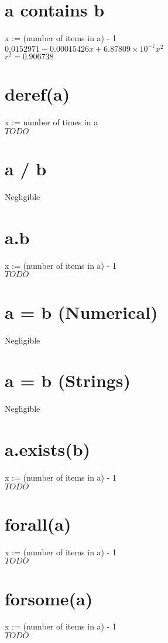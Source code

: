 \documentclass[12pt]{article}
\begin{document}
	\section{a contains b}
	x := (number of items in a) - 1\\
	$0.0152971 - 0.00015426x + 6.87809 \times 10^{-7} x^2$\\
	$r^2 = 0.906738$
	
	\section{deref(a)}
	x := number of times in a\\
	$TODO$
	
	\section{a / b}
	Negligible
	
	\section{a.b}
	x := (number of items in a) - 1\\
	$TODO$
	
	\section{a = b (Numerical)}
	Negligible
	
	\section{a = b (Strings)}
	Negligible
	
	\section{a.exists(b)}
	x := (number of items in a) - 1\\
	$TODO$
	
	\section{forall(a)}
	x := (number of items in a) - 1\\
	$TODO$
	
	\section{forsome(a)}
	x := (number of items in a) - 1\\
	$TODO$
	
\end{document}
